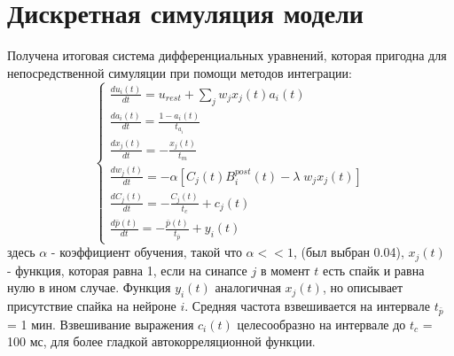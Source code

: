 \documentclass[a4paper,10pt]{article}
\begin{document}
\section*{Дискретная симуляция модели}
Получена итоговая система дифференциальных уравнений, которая пригодна для непосредственной симуляции при помощи методов интеграции:
\begin{equation}
\begin{cases}
\frac{du_{i}(t)}{dt} = u_{rest}+\sum_{j} w_{j} x_{j}(t) a_{i}(t)\\
\frac{da_{i}(t)}{dt} = \frac{1 - a_{i}(t)}{t_{a_{i}}}\\
\frac{dx_{j}(t)}{dt} = -\frac{x_{j}(t)}{t_{m}}\\
\frac{dw_{j}(t)}{dt} = -\alpha[C_{j}(t)B^{post}_{i}(t) - \lambda\;w_{j}x_{j}(t)]\\
\frac{dC_{j}(t)}{dt} = -\frac{C_{j}(t)}{t_{c}} + c_{j}(t)\\
\frac{d\bar{p}(t)}{dt} = -\frac{\bar{p}(t)}{t_{\bar{p}}} + y_{i}(t)
\end{cases}
\end{equation}
здесь $\alpha$ - коэффициент обучения, такой что $\alpha << 1$, (был выбран 0.04), $x_{j}(t)$ - функция, которая равна 1, если на синапсе $j$ в момент $t$ есть спайк и равна нулю в ином случае. Функция $y_{i}(t)$ аналогичная $x_{j}(t)$, но описывает присутствие спайка на нейроне $i$. Средняя частота взвешивается на интервале $t_{\bar{p}}$ = 1 мин. Взвешивание выражения $c_{i}(t)$ целесообразно на интервале до $t_{c}$ = 100 мс, для более гладкой автокорреляционной функции.
\end{document}
